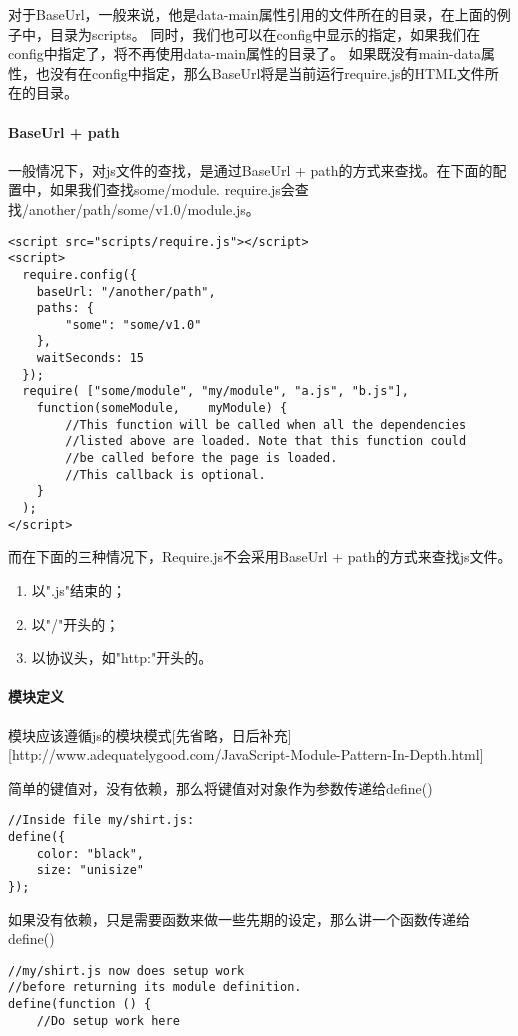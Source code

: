 \documentclass[12pt, oneside, b5paper]{book}
\begin{document}
\begin{CJK}{UTF8}{gkai}
	对于BaseUrl，一般来说，他是data-main属性引用的文件所在的目录，在上面的例子中，目录为scripts。
	同时，我们也可以在config中显示的指定，如果我们在config中指定了，将不再使用data-main属性的目录了。
	如果既没有main-data属性，也没有在config中指定，那么BaseUrl将是当前运行require.js的HTML文件所在的目录。

	\paragraph{BaseUrl + path}
	一般情况下，对js文件的查找，是通过BaseUrl + path的方式来查找。在下面的配置中，如果我们查找some/module.
	require.js会查找/another/path/some/v1.0/module.js。
	\begin{lstlisting}
<script src="scripts/require.js"></script>
<script>
  require.config({
    baseUrl: "/another/path",
    paths: {
        "some": "some/v1.0"
    },
    waitSeconds: 15
  });
  require( ["some/module", "my/module", "a.js", "b.js"],
    function(someModule,    myModule) {
        //This function will be called when all the dependencies
        //listed above are loaded. Note that this function could
        //be called before the page is loaded.
        //This callback is optional.
    }
  );
</script>
	\end{lstlisting}

	而在下面的三种情况下，Require.js不会采用BaseUrl + path的方式来查找js文件。
	\begin{enumerate}
	\item 以".js"结束的；
	\item 以"/"开头的；
	\item 以协议头，如"http:"开头的。
	\end{enumerate}

	\paragraph{模块定义}

	模块应该遵循js的模块模式[先省略，日后补充][http://www.adequatelygood.com/JavaScript-Module-Pattern-In-Depth.html]

	简单的键值对，没有依赖，那么将键值对对象作为参数传递给define()
	\begin{lstlisting}
//Inside file my/shirt.js:
define({
    color: "black",
    size: "unisize"
});
	\end{lstlisting}

	如果没有依赖，只是需要函数来做一些先期的设定，那么讲一个函数传递给define()
	\begin{lstlisting}
//my/shirt.js now does setup work
//before returning its module definition.
define(function () {
    //Do setup work here


\end{lstlisting}
\end{CJK}
\end{document}
